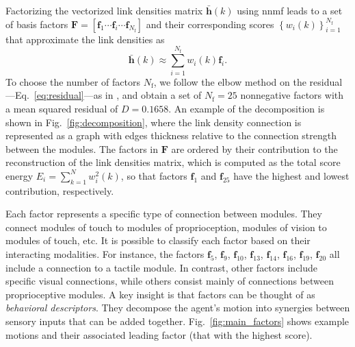 \documentclass[letterpaper, 10 pt, conference]{ieeeconf}  %
\begin{document}
Factorizing the vectorized link densities matrix $\bar{\bm{h}}(k)$ using \ac{nnmf} leads to a set of basis factors  $\bm{F} = [ \bm{f}_1 \cdots \bm{f}_i \cdots \bm{f}_{N_\text{f}}]$ and their corresponding scores $\left\lbrace w_i(k)\right\rbrace^{N_\text{f}}_{i=1}$ that approximate the link densities as
\begin{equation}
    \bar{\bm{h}}(k)\approx \sum_{i=1}^{N_\text{f}} w_i(k) \bm{f}_i.
    \label{eq:decomposition}
\end{equation}
To choose the number of factors $N_\text{f}$, we follow the elbow method on the residual---Eq.~\eqref{eq:residual}---as in \cite{Phalen2020Nonnegativematrix}, and obtain a set of $N_\text{f} = 25$ nonnegative factors with a mean squared residual of $D=0.1658$.
An example of the decomposition is shown in Fig.~\ref{fig:decomposition}, where the link density connection is represented as a graph with edges thickness relative to the connection strength between the modules. The factors in $\mathbf{F}$ are ordered by their contribution to the reconstruction of the link densities matrix, which is computed as the total score energy $E_i =  \sum_{k=1}^N w_i^2(k)$, so that factors $\bm{f}_1$ and $\bm{f}_{25}$ have the highest and lowest contribution, respectively.

Each factor represents a specific type of connection between modules. They connect modules of touch to modules of proprioception, modules of vision to modules of touch, etc. It is possible to classify each factor based on their interacting modalities. For instance, the factors $\bm{f}_5$, $\bm{f}_9$, $\bm{f}_{10}$, $\bm{f}_{13}$, $\bm{f}_{14}$, $\bm{f}_{16}$, $\bm{f}_{19}$, $\bm{f}_{20}$ all include a connection to a tactile module. In contrast, other factors include specific visual connections, while others consist mainly of connections between proprioceptive modules. A key insight is that factors can be thought of as \emph{behavioral descriptors}. They decompose the agent's motion into synergies between sensory inputs that can be added together. Fig.~\ref{fig:main_factors} shows example motions and their associated leading factor (that with the highest score). 

\end{document}
